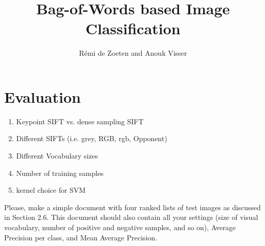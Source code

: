 \documentclass[11pt]{article}
\title{Bag-of-Words based Image Classification}
\author{R\'emi de Zoeten and Anouk Visser}
\begin{document}
\maketitle
\section{Evaluation}
\begin{enumerate}
\item Keypoint SIFT vs. dense sampling SIFT
\item Different SIFTs (i.e. grey, RGB, rgb, Opponent)
\item Different Vocabulary sizes
\item Number of training samples
\item kernel choice for SVM
\end{enumerate}

Please, make a simple document with four ranked lists of test images as discussed in Section 2.6. This document should also contain all your settings (size of visual vocabulary, number of positive and negative samples, and so on), Average Precision per class, and Mean Average Precision.
\end{document}
